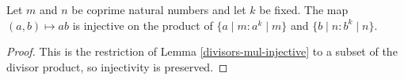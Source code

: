 \begin{theorem}
\label{pow_divisors_mul_injective}
\leanok
Let $m$ and $n$ be coprime natural numbers and let $k$ be fixed. The map $(a,b) \mapsto ab$ is
    injective on the product of $\{a \mid m : a^k \mid m\}$ and $\{b \mid n : b^k \mid n\}$.
\end{theorem}
\begin{proof}
\leanok
This is the restriction of Lemma \ref{divisors-mul-injective} to a subset of the divisor
    product, so injectivity is preserved.
\end{proof}
